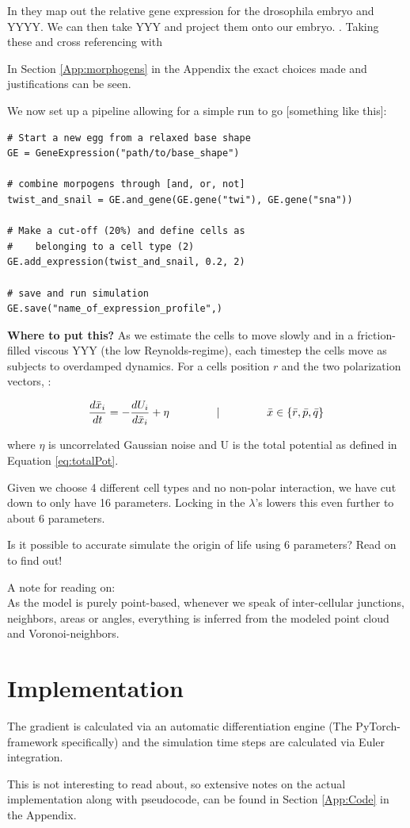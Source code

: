 In \cite{shinyDVEX} they map out the relative gene expression for the drosophila embryo and YYYY. We can then take YYY and project them onto our embryo. . Taking these  and cross referencing with 

In Section \ref{App:morphogens} in the Appendix the exact choices made and justifications can be seen.

We now set up a pipeline allowing for a simple run to go [something like this]:

\begin{lstlisting}
# Start a new egg from a relaxed base shape
GE = GeneExpression("path/to/base_shape")

# combine morpogens through [and, or, not]
twist_and_snail = GE.and_gene(GE.gene("twi"), GE.gene("sna"))

# Make a cut-off (20%) and define cells as 
#    belonging to a cell type (2) 
GE.add_expression(twist_and_snail, 0.2, 2) 

# save and run simulation
GE.save("name_of_expression_profile",)

\end{lstlisting}

\textbf{Where to put this?}
As we estimate the cells to move slowly and in a friction-filled viscous YYY (the low Reynolds-regime), each timestep the cells move as subjects to overdamped dynamics. For a cells position $r$ and the two polarization vectors, :

\begin{equation}
    \frac{d \bar{x}_i}{d t}=-\frac{d U_i}{d \bar{x}_i}+\eta \hspace{1.5cm}|\hspace{1.5cm}  \bar{x} \in \{\bar{r}, \bar{p}, \bar{q}\}
\end{equation}

where $\eta$ is uncorrelated Gaussian noise and U is the total potential as defined in Equation \ref{eq:totalPot}.

Given we choose 4 different cell types and no non-polar interaction, we have cut down to only have 16 parameters. Locking in the $\lambda$'s lowers this even further to about 6 parameters. 

Is it possible to accurate simulate the origin of life using 6 parameters? Read on to find out!

A note for reading on:\\
As the model is purely point-based, whenever we speak of inter-cellular junctions, neighbors, areas or angles, everything is inferred from the modeled point cloud and Voronoi-neighbors.

\section{Implementation}
The gradient is calculated via an automatic differentiation engine (The PyTorch-framework specifically) and the simulation time steps are calculated via Euler integration.

This is not interesting to read about, so extensive notes on the actual implementation along with pseudocode, can be found in Section \ref{App:Code} in the Appendix.

